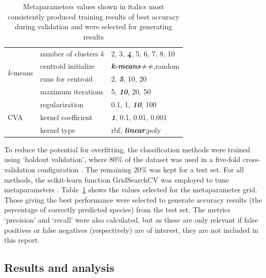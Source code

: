 \documentclass[a4paper, 11pt]{article}
\begin{document}
\begin{table}
\begin{center}
\begin{tabular}{l|l|l}
  \hline
  \multirow{4}{*}{\textit{k}-means} & number of clusters \textit{k}  & 2, 3, \textit{\textbf{4}}, 5, 6, 7, 8, 10\\
                                    & centroid initialize         & \textit{\textbf{k-means++}},random\\
                                    & runs for centroid	     & 2, \textit{\textbf{5}}, 10, 20 \\
                                    & maximum iterations           & 5, \textit{\textbf{10}}, 20, 50 \\
  \hline
    \multirow{3}{*}{CVA}            & regularization   & 0.1, 1, \textit{\textbf{10}}, 100 \\
                                    & kernel coefficient      & \textit{\textbf{1}}, 0.1, 0.01, 0.001 \\
                                    & kernel type                  & rbf, \textit{\textbf{linear}},poly \\
  \hline
  \end{tabular}
  \vspace{-2\baselineskip} %
  \end{center} 
  \caption{\centering\linespread{0.8}\selectfont Metaparameters values shown in italics most consistently produced training results of 
  best accuracy during validation and were selected for generating results}
  \vspace{-1\baselineskip} %
  \label{tab:metaparameters}
\end{table} 

To reduce the potential for overfitting, the classification methods were trained using 
`holdout validation', where 80\% of the dataset was used in a five-fold cross-validation 
configuration \cite{james2013introduction}. The remaining 20\% was kept for a test set. For all methods, 
the scikit-learn function GridSearchCV was employed to tune metaparameters \cite{scikit-learn}. 
Table~\ref{tab:metaparameters} shows the values selected for the metaparameter grid. Those giving the best 
performance were selected to generate accuracy results (the percentage of correctly predicted species) 
from the test set. The metrics `precision' and `recall' were also calculated, but as 
these are only relevant if false positives or false negatives (respectively) are of interest, 
they are not included in this report.


\subsection*{Results and analysis}
\end{document}
